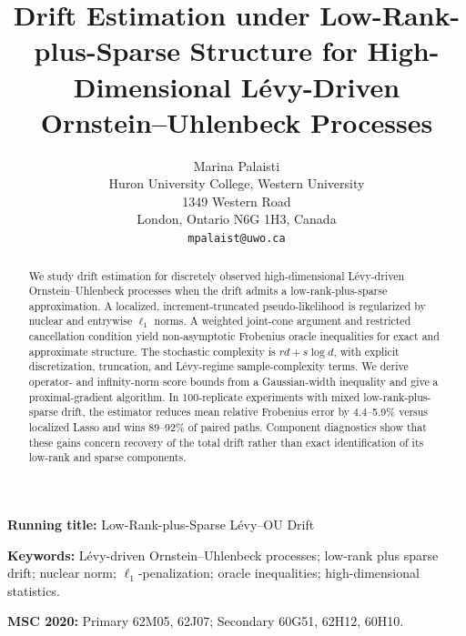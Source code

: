 \documentclass[12pt]{article}
\theoremstyle{definition}
\begin{document}
	\doublespacing
	
	\title{Drift Estimation under Low-Rank-plus-Sparse Structure for High-Dimensional L\'evy-Driven Ornstein--Uhlenbeck Processes}
	
	\author{Marina Palaisti\\Huron University College, Western University\\1349 Western Road\\London, Ontario N6G 1H3, Canada\\\texttt{mpalaist@uwo.ca}}
	
	\date{}
	
	\maketitle
	\begin{center}
		\textbf{Running title:} Low-Rank-plus-Sparse L\'evy--OU Drift
	\end{center}
	
	\begin{abstract}
		We study drift estimation for discretely observed high-dimensional L\'evy-driven Ornstein--Uhlenbeck processes when the drift admits a low-rank-plus-sparse approximation. A localized, increment-truncated pseudo-likelihood is regularized by nuclear and entrywise $\ell_1$ norms. A weighted joint-cone argument and restricted cancellation condition yield non-asymptotic Frobenius oracle inequalities for exact and approximate structure. The stochastic complexity is $rd+s\log d$, with explicit discretization, truncation, and L\'evy-regime sample-complexity terms. We derive operator- and infinity-norm score bounds from a Gaussian-width inequality and give a proximal-gradient algorithm. In 100-replicate experiments with mixed low-rank-plus-sparse drift, the estimator reduces mean relative Frobenius error by 4.4--5.9\% versus localized Lasso and wins 89--92\% of paired paths. Component diagnostics show that these gains concern recovery of the total drift rather than exact identification of its low-rank and sparse components. \end{abstract}
	
	\medskip
	
	\noindent \textbf{Keywords:} L\'evy-driven Ornstein--Uhlenbeck processes; low-rank plus sparse drift; nuclear norm; $\ell_1$-penalization; oracle inequalities; high-dimensional statistics.
	
	\medskip
	
	\noindent \textbf{MSC 2020:} Primary 62M05, 62J07; Secondary 60G51, 62H12, 60H10.
	
\end{document}

